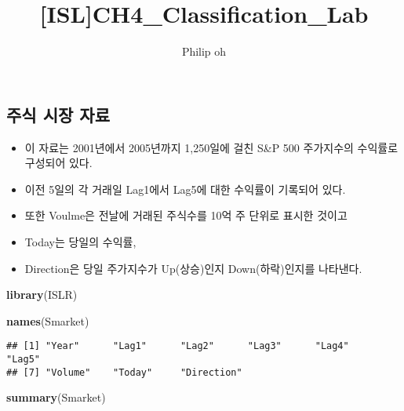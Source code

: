 \documentclass[]{article}
\title{{[}ISL{]}CH4\_Classification\_Lab}
\author{Philip oh}
\date{}
\newenvironment{Shaded}{\begin{snugshade}}{\end{snugshade}}
\newcommand{\KeywordTok}[1]{\textcolor[rgb]{0.13,0.29,0.53}{\textbf{#1}}}
\newcommand{\NormalTok}[1]{#1}
\providecommand{\tightlist}{%
  \setlength{\itemsep}{0pt}\setlength{\parskip}{0pt}}
\begin{document}
\maketitle

\subsection{주식 시장 자료}\label{--}

\begin{itemize}
\tightlist
\item
  이 자료는 2001년에서 2005년까지 1,250일에 걸친 S\&P 500 주가지수의
  수익률로 구성되어 있다.
\item
  이전 5일의 각 거래일 Lag1에서 Lag5에 대한 수익률이 기록되어 있다.
\item
  또한 Voulme은 전날에 거래된 주식수를 10억 주 단위로 표시한 것이고
\item
  Today는 당일의 수익률,
\item
  Direction은 당일 주가지수가 Up(상승)인지 Down(하락)인지를 나타낸다.
\end{itemize}

\begin{Shaded}
\begin{Highlighting}[]
\KeywordTok{library}\NormalTok{(ISLR)}
\end{Highlighting}
\end{Shaded}

\begin{Shaded}
\begin{Highlighting}[]
\KeywordTok{names}\NormalTok{(Smarket)}
\end{Highlighting}
\end{Shaded}

\begin{verbatim}
## [1] "Year"      "Lag1"      "Lag2"      "Lag3"      "Lag4"      "Lag5"     
## [7] "Volume"    "Today"     "Direction"
\end{verbatim}

\begin{Shaded}
\begin{Highlighting}[]
\KeywordTok{summary}\NormalTok{(Smarket)}
\end{Highlighting}
\end{Shaded}
\end{document}
